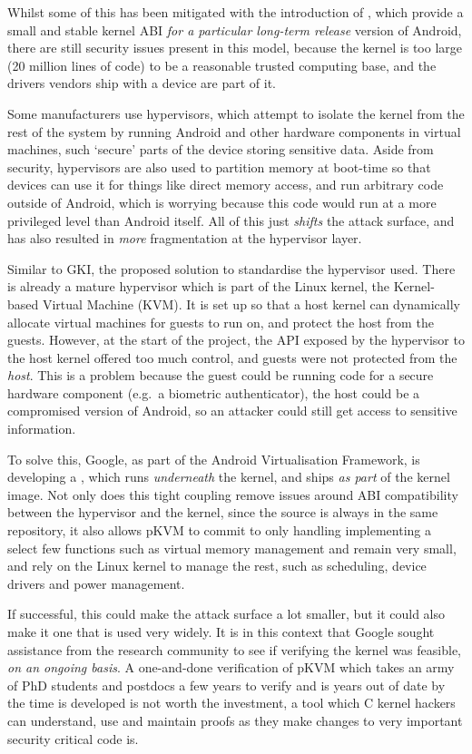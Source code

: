 Whilst some of this has been mitigated with the introduction of
, which provide a small and stable
kernel ABI \emph{for a particular long-term release} version of Android, there
are still security issues present in this model, because the kernel is too
large (20 million lines of code) to be a reasonable trusted computing base, and
the drivers vendors ship with a device are part of it.

Some manufacturers use hypervisors, which attempt to isolate the kernel from
the rest of the system by running Android and other hardware components in
virtual machines, such `secure' parts of the device storing sensitive data.
Aside from security, hypervisors are also used to partition memory at boot-time
so that devices can use it for things like direct memory access, and run
arbitrary code outside of Android, which is worrying because this code would
run at a more privileged level than Android itself. All of this just
\emph{shifts} the attack surface, and has also resulted in \emph{more}
fragmentation at the hypervisor layer.

Similar to GKI, the proposed solution to standardise the hypervisor used. There
is already a mature hypervisor which is part of the Linux kernel, the
Kernel-based Virtual Machine (KVM)\@. It is set up so that a host kernel can
dynamically allocate virtual machines for guests to run on, and protect the
host from the guests. However, at the start of the project, the API exposed by
the hypervisor to the host kernel offered too much control, and guests were not
protected from the \emph{host}. This is a problem because the guest could be
running code for a secure hardware component (e.g.\ a biometric authenticator),
the host could be a compromised version of Android, so an attacker could still
get access to sensitive information.

To solve this, Google, as part of the Android Virtualisation Framework, is
developing a , which runs \emph{underneath}
the kernel, and ships \emph{as part} of the kernel image. Not only does this
tight coupling remove issues around ABI compatibility between the hypervisor
and the kernel, since the source is always in the same repository, it also
allows pKVM to commit to only handling implementing a select few functions such
as virtual memory management and remain very small, and rely on the Linux
kernel to manage the rest, such as scheduling, device drivers and power
management.

If successful, this could make the attack surface a lot smaller, but it could
also make it one that is used very widely. It is in this context that Google
sought assistance from the research community to see if verifying the kernel
was feasible, \emph{on an ongoing basis}. A one-and-done verification of pKVM
which takes an army of PhD students and postdocs a few years to verify and is
years out of date by the time is developed is not worth the investment, a
tool which C kernel hackers can understand, use and maintain proofs as they
make changes to very important security critical code is.

